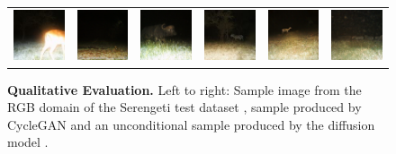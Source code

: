 \begin{figure}[htp!]
\begin{tabularx}{\textwidth}{Y Y Y !{\space} Y Y Y}
        \includegraphics{gfx/unconditional-diffusion-sampling-qual/rgb_S2_B05_R2_IMAG0016.jpg} & \includegraphics{gfx/unconditional-diffusion-sampling-qual/cyclegan_S2_B06_R3_PICT3848_fake.png} & \includegraphics{gfx/unconditional-diffusion-sampling-qual/diffusion_S2_B07_R2_PICT0277.png} & \includegraphics{gfx/unconditional-diffusion-sampling-qual/rgb_S2_B05_R3_IMAG1018.jpg} & \includegraphics{gfx/unconditional-diffusion-sampling-qual/cyclegan_S2_B07_R1_PICT3274_fake.png} & \includegraphics{gfx/unconditional-diffusion-sampling-qual/diffusion_S2_B07_R1_PICT3274.png}
    \end{tabularx}
    \caption{
        \textbf{Qualitative Evaluation.} Left to right: Sample image from the RGB domain of the Serengeti test dataset \parencite{serengeti},
        sample produced by CycleGAN \parencite{mehri} and an unconditional sample produced by the diffusion model \parencite{diffusion-beats-gans}.
    }
    \label{fig:qualitative-evaluation-unconditional-sampling}
\end{figure}

